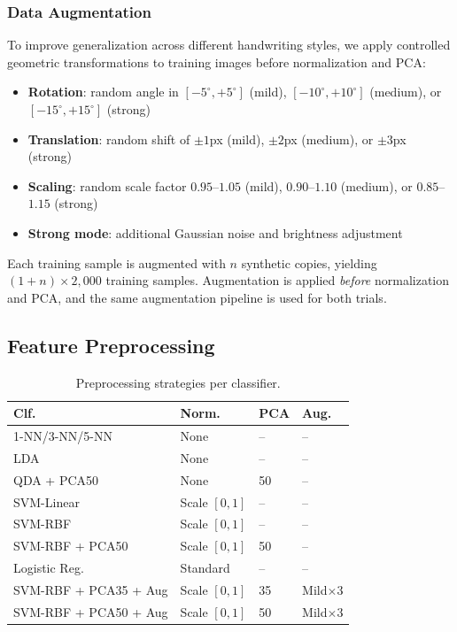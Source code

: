\documentclass[11pt,a4paper,twocolumn]{article}
\begin{document}
\subsubsection{Data Augmentation}
To improve generalization across different handwriting styles, we apply controlled geometric transformations to training images before normalization and PCA:
\begin{itemize}[noitemsep]
    \item \textbf{Rotation}: random angle in $[-5^\circ, +5^\circ]$ (mild), $[-10^\circ, +10^\circ]$ (medium), or $[-15^\circ, +15^\circ]$ (strong)
    \item \textbf{Translation}: random shift of $\pm 1$px (mild), $\pm 2$px (medium), or $\pm 3$px (strong)
    \item \textbf{Scaling}: random scale factor $0.95$--$1.05$ (mild), $0.90$--$1.10$ (medium), or $0.85$--$1.15$ (strong)
    \item \textbf{Strong mode}: additional Gaussian noise and brightness adjustment
\end{itemize}
Each training sample is augmented with $n$ synthetic copies, yielding $(1+n) \times 2{,}000$ training samples. Augmentation is applied \emph{before} normalization and PCA, and the same augmentation pipeline is used for both trials.

\subsection{Feature Preprocessing}

\begin{table}[H]
\centering
\caption{Preprocessing strategies per classifier.}
\label{tab:preprocessing}
\setlength{\tabcolsep}{2pt}
\footnotesize
\begin{tabular}{@{}llll@{}}
\toprule
\textbf{Clf.} & \textbf{Norm.} & \textbf{PCA} & \textbf{Aug.} \\
\midrule
1-NN/3-NN/5-NN & None & -- & -- \\
LDA & None & -- & -- \\
QDA + PCA50 & None & 50 & -- \\
SVM-Linear & Scale $[0,1]$ & -- & -- \\
SVM-RBF & Scale $[0,1]$ & -- & -- \\
SVM-RBF + PCA50 & Scale $[0,1]$ & 50 & -- \\
Logistic Reg. & Standard & -- & -- \\
SVM-RBF + PCA35 + Aug & Scale $[0,1]$ & 35 & Mild$\times$3 \\
SVM-RBF + PCA50 + Aug & Scale $[0,1]$ & 50 & Mild$\times$3 \\
\bottomrule
\end{tabular}
\end{table}
\end{document}
